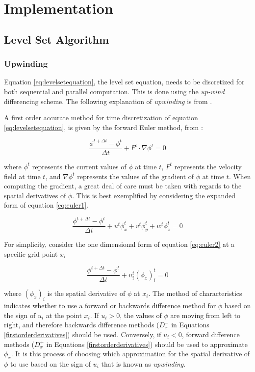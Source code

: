 \chapter{Implementation}

\section{Level Set Algorithm}\label{levelsetalgorithm}

\subsection{Upwinding}\label{upwinding}
Equation \eqref{eq:levelsetequation}, the level set equation, needs to be discretized for both sequential and parallel computation. This is done using the \textit{up-wind} differencing scheme. The following explanation of \textit{upwinding} is from \cite{osher2003lsm}.

A first order accurate method for time discretization of equation \eqref{eq:levelsetequation}, is given by the forward Euler method, from \cite{osher2003lsm}:

\begin{equation}
\frac{\phi^{t+\Delta t}-\phi^t}{\Delta t} +F^{t}\cdot{\nabla{\phi^{t}}} = 0
\label{eq:euler1}
\end{equation}

where $\phi^{t}$ represents the current values of $\phi$ at time $t$, $F^{t}$ represents the velocity field at time $t$, and  $\nabla{\phi^{t}}$ represents the values of the gradient of $\phi$ at time $t$. When computing the gradient, a great deal of care must be taken with regards to the spatial derivatives of $\phi$. This is best exemplified by considering the expanded form of equation \eqref{eq:euler1}.

\begin{equation}
\frac{\phi^{t+\Delta t}-\phi^t}{\Delta t} +u^{t}\phi_x^t+v^{t}\phi_y^t+w^{t}\phi_z^t = 0
\label{eq:euler2}
\end{equation}

For simplicity, consider the one dimensional form of equation \eqref{eq:euler2} at a specific grid point $x_i$ 

\begin{equation}
\frac{\phi^{t+\Delta t}-\phi^t}{\Delta t} +u_i^{t}(\phi_x)_i^t = 0
\label{eq:euler3}
\end{equation}

where $(\phi_x)_i$ is the spatial derivative of $\phi$ at $x_i$. The method of characteristics indicates whether to use a forward or backwards difference method for $\phi$ based on the sign of $u_i$ at the point $x_i$. If $u_i > 0$, the values of $\phi$ are moving from left to right, and therefore backwards difference methods ($D_x^-$ in Equations \ref{firstorderderivatives}) should be used. Conversely, if $u_i<0$, forward difference methods ($D_x^+$ in Equations \ref{firstorderderivatives}) should be used to approximate $\phi_x$. It is this process of choosing which approximation for the spatial derivative of $\phi$ to use based on the sign of $u_i$ that is known as \textit{upwinding}. 

